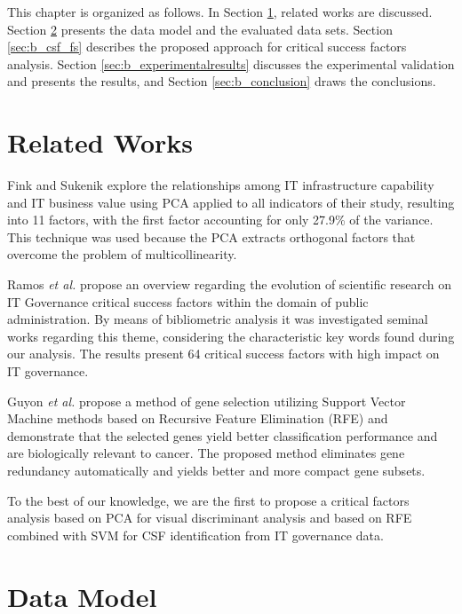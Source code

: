 This chapter is organized as follows. In Section \ref{sec:b_relatedworks}, related works are discussed. Section \ref{sec:b_datamodel} presents the data model and the evaluated data sets. Section \ref{sec:b_csf_fs} describes the proposed approach for critical success factors analysis. Section \ref{sec:b_experimentalresults} discusses the experimental validation and presents the results, and Section \ref{sec:b_conclusion} draws the conclusions.


\section{Related Works}
\label{sec:b_relatedworks}

Fink and Sukenik \cite{fink2011effect} explore the relationships among IT infrastructure capability and IT business value using PCA applied to all indicators of their study, resulting into 11 factors, with the first factor accounting for only 27.9\% of the variance. This technique was used because the PCA extracts orthogonal factors that overcome the problem of multicollinearity.

Ramos \emph{et al.}  propose an overview regarding the evolution of scientific research on IT Governance critical success factors within the domain of public administration. By means of bibliometric analysis it was investigated seminal works regarding this theme, considering the characteristic key words found during our analysis. The results present 64 critical success factors with high impact on IT governance.

Guyon \emph{et al.} \cite{guyon2002gene} propose a method of gene selection utilizing Support Vector Machine methods based on Recursive Feature Elimination (RFE) and demonstrate that the selected genes yield better classification performance and are biologically relevant to cancer.  The proposed method eliminates gene redundancy automatically and yields better and more compact gene subsets. 

To the best of our knowledge, we are the first to propose a critical factors analysis based on PCA for visual discriminant analysis and based on RFE combined with SVM for CSF identification from IT governance data.

\section{Data Model}
\label{sec:b_datamodel}

